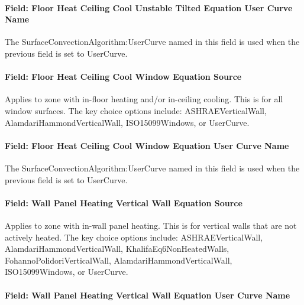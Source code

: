 \paragraph{Field: Floor Heat Ceiling Cool Unstable Tilted Equation User Curve Name}\label{field-floor-heat-ceiling-cool-unstable-tilted-equation-user-curve-name}

The SurfaceConvectionAlgorithm:UserCurve named in this field is used when the previous field is set to UserCurve.

\paragraph{Field: Floor Heat Ceiling Cool Window Equation Source}\label{field-floor-heat-ceiling-cool-window-equation-source}

Applies to zone with in-floor heating and/or in-ceiling cooling. This is for all window surfaces. The key choice options include: ASHRAEVerticalWall, AlamdariHammondVerticalWall, ISO15099Windows, or UserCurve.

\paragraph{Field: Floor Heat Ceiling Cool Window Equation User Curve Name}\label{field-floor-heat-ceiling-cool-window-equation-user-curve-name}

The SurfaceConvectionAlgorithm:UserCurve named in this field is used when the previous field is set to UserCurve.

\paragraph{Field: Wall Panel Heating Vertical Wall Equation Source}\label{field-wall-panel-heating-vertical-wall-equation-source}

Applies to zone with in-wall panel heating. This is for vertical walls that are not actively heated. The key choice options include: ASHRAEVerticalWall, AlamdariHammondVerticalWall, KhalifaEq6NonHeatedWalls, FohannoPolidoriVerticalWall, AlamdariHammondVerticalWall, ISO15099Windows, or UserCurve.

\paragraph{Field: Wall Panel Heating Vertical Wall Equation User Curve Name}\label{field-wall-panel-heating-vertical-wall-equation-user-curve-name}

